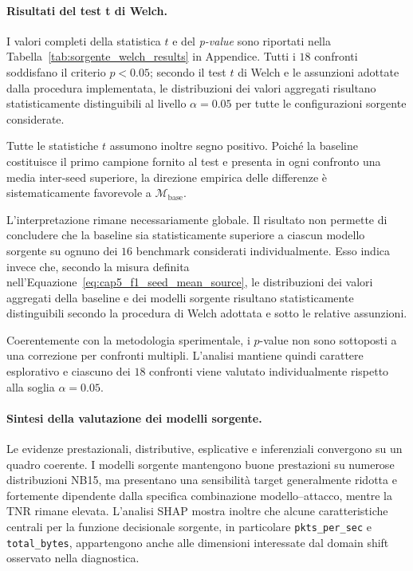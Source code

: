 \paragraph{Risultati del test t di Welch.}
I valori completi della statistica $t$ e del \textit{p-value} sono riportati nella Tabella~\ref{tab:sorgente_welch_results} in Appendice. 
Tutti i $18$ confronti soddisfano il criterio $p<0.05$; secondo il test $t$ di Welch e le assunzioni adottate dalla procedura implementata, le distribuzioni dei valori aggregati risultano statisticamente distinguibili al livello $\alpha=0.05$ per tutte le configurazioni sorgente considerate.

Tutte le statistiche $t$ assumono inoltre segno positivo. 
Poiché la baseline costituisce il primo campione fornito al test e presenta in ogni confronto una media inter-seed superiore, la direzione empirica delle differenze è sistematicamente favorevole a $\mathcal{M}_{\mathrm{base}}$.

L'interpretazione rimane necessariamente globale. 
Il risultato non permette di concludere che la baseline sia statisticamente superiore a ciascun modello sorgente su ognuno dei $16$ benchmark considerati individualmente. 
Esso indica invece che, secondo la misura definita nell'Equazione~\eqref{eq:cap5_f1_seed_mean_source}, le distribuzioni dei valori aggregati della baseline e dei modelli sorgente risultano statisticamente distinguibili secondo la procedura di Welch adottata e sotto le relative assunzioni.

Coerentemente con la metodologia sperimentale, i $p$-value non sono sottoposti a una correzione per confronti multipli. 
L'analisi mantiene quindi carattere esplorativo e ciascuno dei $18$ confronti viene valutato individualmente rispetto alla soglia $\alpha=0.05$.

\paragraph{Sintesi della valutazione dei modelli sorgente.}
Le evidenze prestazionali, distributive, esplicative e inferenziali convergono su un quadro coerente. 
I modelli sorgente mantengono buone prestazioni su numerose distribuzioni NB15, ma presentano una sensibilità target generalmente ridotta e fortemente dipendente dalla specifica combinazione modello--attacco, mentre la TNR rimane elevata. 
L'analisi SHAP mostra inoltre che alcune caratteristiche centrali per la funzione decisionale sorgente, in particolare \texttt{pkts\_per\_sec} e \texttt{total\_bytes}, appartengono anche alle dimensioni interessate dal domain shift osservato nella diagnostica.

